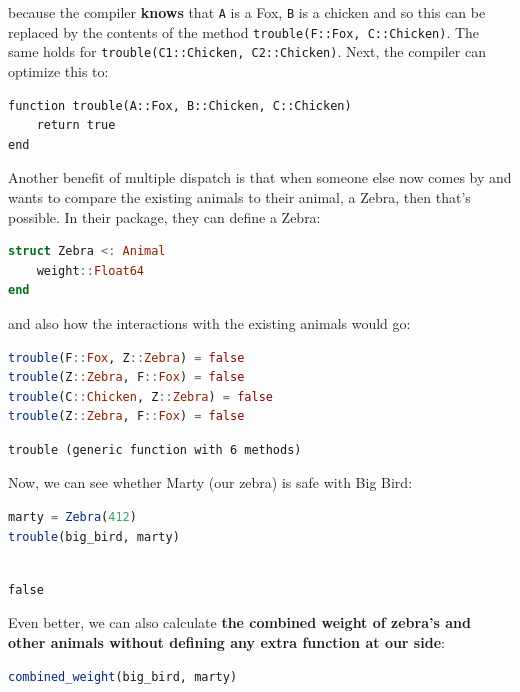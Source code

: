 \documentclass[
  notoc %
]{tufte-book}
\newcommand{\passthrough}[1]{#1}
\begin{document}
because the compiler \textbf{knows} that \passthrough{\lstinline!A!} is
a Fox, \passthrough{\lstinline!B!} is a chicken and so this can be
replaced by the contents of the method
\passthrough{\lstinline!trouble(F::Fox, C::Chicken)!}. The same holds
for \passthrough{\lstinline!trouble(C1::Chicken, C2::Chicken)!}. Next,
the compiler can optimize this to:

\begin{lstlisting}
function trouble(A::Fox, B::Chicken, C::Chicken)
    return true
end
\end{lstlisting}

Another benefit of multiple dispatch is that when someone else now comes
by and wants to compare the existing animals to their animal, a Zebra,
then that's possible. In their package, they can define a Zebra:

\begin{lstlisting}[language=Julia]
struct Zebra <: Animal
    weight::Float64
end
\end{lstlisting}

and also how the interactions with the existing animals would go:

\begin{lstlisting}[language=Julia]
trouble(F::Fox, Z::Zebra) = false
trouble(Z::Zebra, F::Fox) = false
trouble(C::Chicken, Z::Zebra) = false
trouble(Z::Zebra, F::Fox) = false
\end{lstlisting}

\begin{lstlisting}[language=Output]
trouble (generic function with 6 methods)
\end{lstlisting}

Now, we can see whether Marty (our zebra) is safe with Big Bird:

\begin{lstlisting}[language=Julia]
marty = Zebra(412)
trouble(big_bird, marty)
\end{lstlisting}

\begin{lstlisting}[language=Output]

false

\end{lstlisting}

Even better, we can also calculate \textbf{the combined weight of
zebra's and other animals without defining any extra function at our
side}:

\begin{lstlisting}[language=Julia]
combined_weight(big_bird, marty)
\end{lstlisting}
\end{document}
